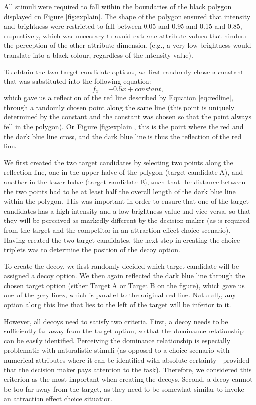 \documentclass[11pt,a4paper]{article}
\begin{document}
All stimuli were required to fall within the boundaries of the black polygon displayed on Figure \ref{fig:explain}. The shape of the polygon ensured that intensity and brightness were restricted to fall between 0.05 and 0.95 and 0.15 and 0.85, respectively, which was necessary to avoid extreme attribute values that hinders the perception of the other attribute dimension (e.g., a very low brightness would translate into a black colour, regardless of the intensity value). 

 To obtain the two target candidate options, we first randomly chose a constant that was substituted into the following equation:
\begin{equation} \label{eq:blueline}
 f_{x} = -0.5x + constant,
\end{equation}
which gave us a reflection of the red line described by Equation \ref{eq:redline}, through a randomly chosen point along the same line (this point is uniquely determined by the constant and the constant was chosen so that the point always fell in the polygon). On Figure \ref{fig:explain}, this is the point where the red and the dark blue line cross, and the dark blue line is thus the reflection of the red line.

 We first created the two target candidates by selecting two points along the reflection line, one in the upper halve of the polygon (target candidate A), and another in the lower halve (target candidate B), such that the distance between the two points had to be at least half the overall length of the dark blue line within the polygon. This was important in order to ensure that one of the target candidates has a high intensity and a low brightness value and vice versa, so that they will be perceived as markedly different by the decision maker (as is required from the target and the competitor in an attraction effect choice scenario). Having created the two target candidates, the next step in creating the choice triplets was to determine the position of the decoy option. 

To create the decoy, we first randomly decided which target candidate will be assigned a decoy option. We then again reflected the dark blue line through the chosen target option (either Target A or Target B on the figure), which gave us one of the grey lines, which is parallel to the original red line. Naturally, any option along this line that lies to the left of the target will be inferior to it. 

However, all decoys need to satisfy two criteria. First, a decoy needs to be sufficiently far away from the target option, so that the dominance relationship can be easily identified. Perceiving the dominance relationship is especially problematic with naturalistic stimuli (as opposed to a choice scenario with numerical attributes where it can be identified with absolute certainty - provided that the decision maker pays attention to the task). Therefore, we considered this criterion as the most important when creating the decoys. Second, a decoy cannot be too far away from the target, as they need to be somewhat similar to invoke an attraction effect choice situation.
\end{document}
